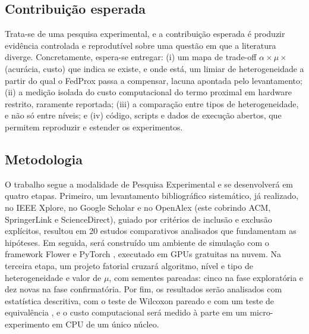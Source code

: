 \subsection{Contribuição esperada}

Trata-se de uma pesquisa experimental, e a contribuição esperada é produzir evidência controlada e reprodutível sobre uma questão em que a literatura diverge. Concretamente, espera-se entregar: (i) um mapa de trade-off $\alpha \times \mu \times$ (acurácia, custo) que indica se existe, e onde está, um limiar de heterogeneidade a partir do qual o FedProx passa a compensar, lacuna apontada pelo levantamento; (ii) a medição isolada do custo computacional do termo proximal em hardware restrito, raramente reportada; (iii) a comparação entre tipos de heterogeneidade, e não só entre níveis; e (iv) código, scripts e dados de execução abertos, que permitem reproduzir e estender os experimentos.

\subsection{Metodologia}

O trabalho segue a modalidade de Pesquisa Experimental e se desenvolverá em quatro etapas. Primeiro, um levantamento bibliográfico sistemático, já realizado, no IEEE Xplore, no Google Scholar e no OpenAlex (este cobrindo ACM, SpringerLink e ScienceDirect), guiado por critérios de inclusão e exclusão explícitos, resultou em 20 estudos comparativos analisados que fundamentam as hipóteses. Em seguida, será construído um ambiente de simulação com o framework Flower \citep{beutel2020flower} e PyTorch \citep{paszke2019pytorch}, executado em GPUs gratuitas na nuvem. Na terceira etapa, um projeto fatorial cruzará algoritmo, nível e tipo de heterogeneidade e valor de $\mu$, com sementes pareadas: cinco na fase exploratória e dez novas na fase confirmatória. Por fim, os resultados serão analisados com estatística descritiva, com o teste de Wilcoxon pareado \citep{wilcoxon1945} e com um teste de equivalência \citep{schuirmann1987tost}, e o custo computacional será medido à parte em um micro-experimento em CPU de um único núcleo.
